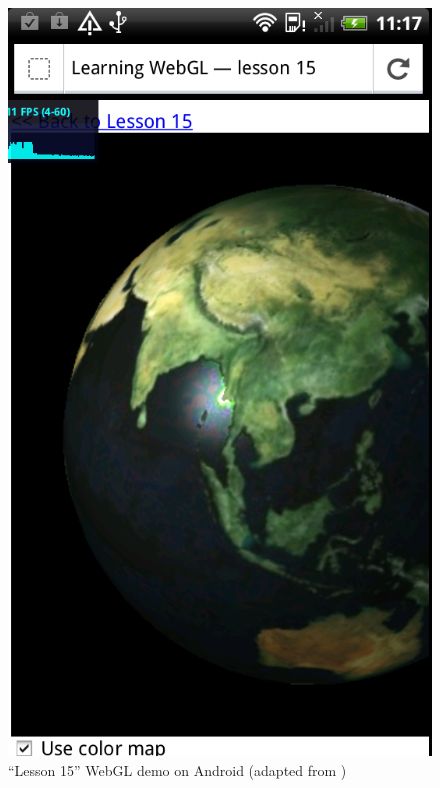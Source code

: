 \documentclass[12pt,journal,compsoc]{IEEEtran}
\begin{document}
\begin{figure}[htb]
	\begin{center}
	\includegraphics[width=0.8\columnwidth]{grafiken/lesson15_Android}
      \caption{“Lesson 15” WebGL demo on Android (adapted from \cite{lesson15})}
      \label{fig:lesson15_Android}
    \end{center}
\end{figure}
\end{document}
